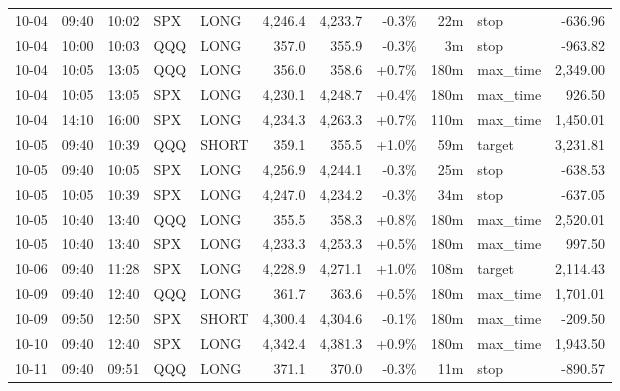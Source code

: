 \documentclass[11pt,a4paper,twoside]{article}
\begin{document}
\begin{center}
\begin{longtable}{>{\color{txtmain}}l l l l l r r r r >{\color{txtmain}}l r}
10-04 & 09:40 & 10:02 & SPX & LONG & 4,246.4 & 4,233.7 & \textcolor{lossred}{-0.3\%} & 22m & stop & \textcolor{lossred}{-636.96} \\
10-04 & 10:00 & 10:03 & QQQ & LONG & 357.0 & 355.9 & \textcolor{lossred}{-0.3\%} & 3m & stop & \textcolor{lossred}{-963.82} \\
10-04 & 10:05 & 13:05 & QQQ & LONG & 356.0 & 358.6 & \textcolor{wingreen}{+0.7\%} & 180m & max\_time & \textcolor{wingreen}{2,349.00} \\
10-04 & 10:05 & 13:05 & SPX & LONG & 4,230.1 & 4,248.7 & \textcolor{wingreen}{+0.4\%} & 180m & max\_time & \textcolor{wingreen}{926.50} \\
10-04 & 14:10 & 16:00 & SPX & LONG & 4,234.3 & 4,263.3 & \textcolor{wingreen}{+0.7\%} & 110m & max\_time & \textcolor{wingreen}{1,450.01} \\
10-05 & 09:40 & 10:39 & QQQ & SHORT & 359.1 & 355.5 & \textcolor{wingreen}{+1.0\%} & 59m & target & \textcolor{wingreen}{3,231.81} \\
10-05 & 09:40 & 10:05 & SPX & LONG & 4,256.9 & 4,244.1 & \textcolor{lossred}{-0.3\%} & 25m & stop & \textcolor{lossred}{-638.53} \\
10-05 & 10:05 & 10:39 & SPX & LONG & 4,247.0 & 4,234.2 & \textcolor{lossred}{-0.3\%} & 34m & stop & \textcolor{lossred}{-637.05} \\
10-05 & 10:40 & 13:40 & QQQ & LONG & 355.5 & 358.3 & \textcolor{wingreen}{+0.8\%} & 180m & max\_time & \textcolor{wingreen}{2,520.01} \\
10-05 & 10:40 & 13:40 & SPX & LONG & 4,233.3 & 4,253.3 & \textcolor{wingreen}{+0.5\%} & 180m & max\_time & \textcolor{wingreen}{997.50} \\
10-06 & 09:40 & 11:28 & SPX & LONG & 4,228.9 & 4,271.1 & \textcolor{wingreen}{+1.0\%} & 108m & target & \textcolor{wingreen}{2,114.43} \\
10-09 & 09:40 & 12:40 & QQQ & LONG & 361.7 & 363.6 & \textcolor{wingreen}{+0.5\%} & 180m & max\_time & \textcolor{wingreen}{1,701.01} \\
10-09 & 09:50 & 12:50 & SPX & SHORT & 4,300.4 & 4,304.6 & \textcolor{lossred}{-0.1\%} & 180m & max\_time & \textcolor{lossred}{-209.50} \\
10-10 & 09:40 & 12:40 & SPX & LONG & 4,342.4 & 4,381.3 & \textcolor{wingreen}{+0.9\%} & 180m & max\_time & \textcolor{wingreen}{1,943.50} \\
10-11 & 09:40 & 09:51 & QQQ & LONG & 371.1 & 370.0 & \textcolor{lossred}{-0.3\%} & 11m & stop & \textcolor{lossred}{-890.57} \\

\end{longtable}
\end{center}
\end{document}
